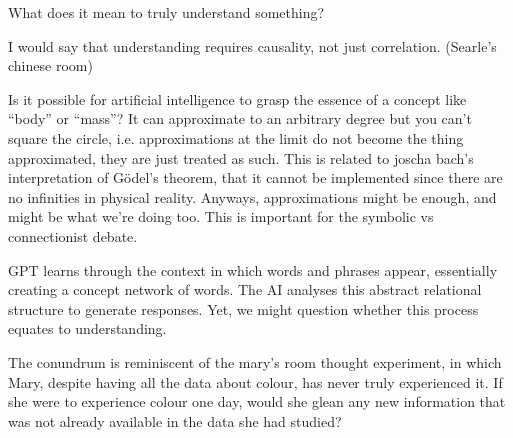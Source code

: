 What does it mean to truly understand something? 

I would say that understanding requires causality, not just correlation. (Searle's chinese room)

Is it possible for artificial intelligence to grasp the essence of a concept like “body” or “mass”? It can approximate to an arbitrary degree but you can't square the circle, i.e. approximations at the limit do not become the thing approximated, they are just treated as such. This is related to joscha bach's interpretation of Gödel's theorem, that it cannot be implemented since there are no infinities in physical reality. Anyways, approximations might be enough, and might be what we're doing too. This is important for the symbolic vs connectionist debate.

GPT learns through the context in which words and phrases appear, essentially creating a concept network of words. The AI analyses this abstract relational structure to generate responses. Yet, we might question whether this process equates to understanding.

The conundrum is reminiscent of the mary's room thought experiment, in which Mary, despite having all the data about colour, has never truly experienced it. If she were to experience colour one day, would she glean any new information that was not already available in the data she had studied?

